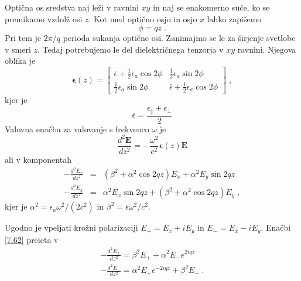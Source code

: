 Optična os sredstva naj leži v ravnini $xy$ in naj se enakomerno
suče, ko se premikamo vzdolž osi $z$. Kot med optično osjo in osjo
$x$ lahko zapišemo 
\begin{equation}
\phi=qz\;.\label{7.58}
\end{equation}
 Pri tem je $2\pi/q$ perioda sukanja optične osi. Zanimajmo se le
za širjenje svetlobe v smeri $z$. Tedaj potrebujemo le del dielektričnega
tenzorja v $xy$ ravnini. Njegova oblika je 
\begin{equation}
\boldsymbol{\epsilon}(z)=\left[\begin{array}{cc}
\bar{\epsilon}+\frac{1}{2}\epsilon_{a}\cos2\phi & \frac{1}{2}\epsilon_{a}\sin2\phi\\
\frac{1}{2}\epsilon_{a}\sin2\phi & \bar{\epsilon}+\frac{1}{2}\epsilon_{a}\cos2\phi
\end{array}\right]\;,\label{7.59}
\end{equation}
 kjer je 
\begin{equation}
\bar{\epsilon}=\frac{\epsilon_{\parallel}+\epsilon_{\perp}}{2}\label{7.60}
\end{equation}
 Valovna enačba za valovanje s frekvenco $\omega$ je 
\begin{equation}
\frac{d^{2}\mathbf{E}}{dz^{2}}=-\frac{\omega^{2}}{c^{2}}\boldsymbol{\epsilon}(z)\mathbf{E}\label{7.61}
\end{equation}
 ali v komponentah 
\begin{eqnarray}
-\frac{d^{2}E_{x}}{dz^{2}} & = & (\beta^{2}+\alpha^{2}\cos2qz)E_{x}+\alpha^{2}E_{y}\sin2qz\nonumber \\
-\frac{d^{2}E_{y}}{dz^{2}} & = & \alpha^{2}E_{x}\sin2qz+(\beta^{2}+\alpha^{2}\cos2qz)E_{y}\;,
\end{eqnarray}
 kjer je $\alpha^{2}=\epsilon_{a}\omega^{2}/(2c^{2})$ in $\beta^{2}=\bar{\epsilon}\omega^{2}/c^{2}$.

Ugodno je vpeljati krožni polarizaciji $E_{+}=E_{x}+iE_{y}$ in $E_{-}=E_{x}-iE_{y}$.
Enačbi \ref{7.62} preieta v 
\begin{eqnarray}
-\frac{d^{2}E_{+}}{dz^{2}}=\beta^{2}E_{+}+\alpha^{2}E_{-}e^{2iqz}\nonumber \\
-\frac{d^{2}E_{-}}{dz^{2}}=\alpha^{2}E_{+}e^{-2iqz}+\beta^{2}E_{-}\;.
\end{eqnarray}


